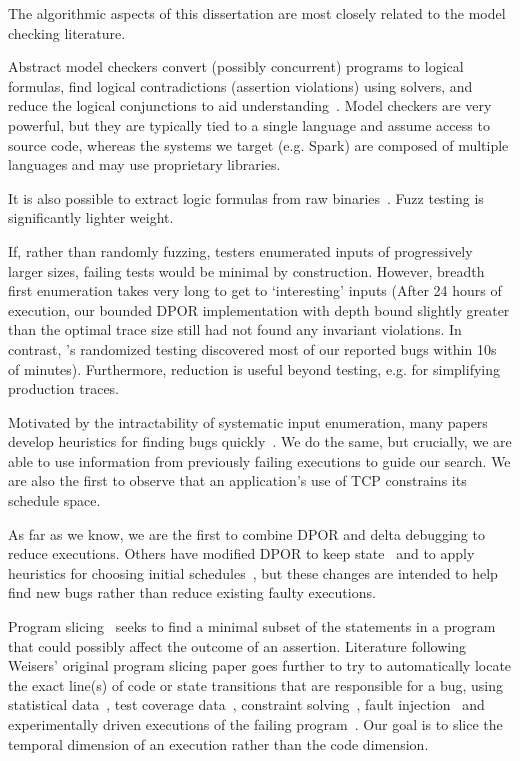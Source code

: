 The algorithmic aspects of this
dissertation are most closely
related to the model checking literature.

Abstract model checkers convert (possibly concurrent) programs to logical formulas, find
logical contradictions (assertion violations) using solvers, and reduce the logical
conjunctions to aid
understanding~\cite{christ2013flow,khoshnood2015concbugassist,machado2015concurrency}.
Model checkers are very powerful, but they are typically tied to a single
language and assume access to source code, whereas the systems we target (e.g.
Spark) are composed of multiple languages and may use proprietary
libraries.

It is also possible to extract logic formulas from raw binaries~\cite{avgerinos2014enhancing}.
Fuzz testing is significantly lighter weight.

If, rather than randomly fuzzing, testers
enumerated inputs of progressively larger sizes, failing tests would
be minimal by construction. However, breadth first enumeration takes very long to get to
`interesting' inputs (After 24 hours of execution, our bounded DPOR
implementation with depth bound slightly greater than the optimal trace size still had not found any invariant violations. In
contrast, \sys's randomized testing discovered
most of our reported bugs within 10s of minutes).
Furthermore, reduction is
useful beyond testing, e.g. for simplifying production traces.

Motivated by the intractability of systematic input enumeration, many papers
develop heuristics for finding bugs
quickly~\cite{tzoref2007instrumenting,musuvathi2007iterative,musuvathi2008finding,yabandeh2009crystalball,burckhardt2010randomized,terragnirecontest,fonseca2014ski,leesatapornwongsa2014samc,lin2009modist,park2009ctrigger,coons2010gambit}.
We do the same, but crucially, we are able to use
information from previously failing executions to guide our search.
We are also the first to observe that
an application's use
of TCP constrains its schedule space.

As far as we know, we are the first to combine DPOR and delta debugging to
reduce executions. Others have modified DPOR to keep state~\cite{yang2008efficient,yi2006stateful}
and to apply heuristics for choosing initial schedules~\cite{lauterburg2010evaluating}, but these
changes are intended to help find new bugs rather than reduce existing
faulty executions.

 Program slicing~\cite{weiser1981program}
seeks to find a minimal subset of the statements in a program that could
possibly affect the outcome of an assertion.
Literature following Weisers' original program
slicing paper goes further to try to
automatically locate the exact line(s) of code or state transitions that are responsible for a
bug, using statistical data~\cite{zhangzhang}, test coverage
data~\cite{coverage_localization,xuan14}, constraint solving~\cite{jose11},
fault injection~\cite{zhang13} and
experimentally driven executions of the failing program~\cite{zeller2005,comparative_causality}.
Our goal is to slice the temporal dimension of an execution rather than the
code dimension.

